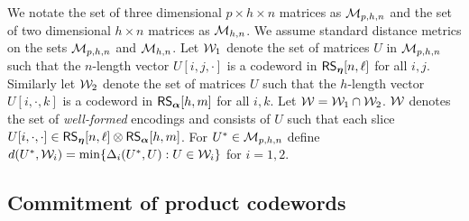 We notate the set of three dimensional $p\times h\times n$ matrices as $\mathcal{M}_{p,h,n}$ and
the set of two dimensional $h\times n$ matrices as $\mathcal{M}_{h, n}$. We
assume standard distance metrics on the sets $\mathcal{M}_{p,h,n}$ and $\mathcal{M}_{h,n}$.
Let $\mathcal{W}_1$ denote the set of matrices
$U$ in $\mathcal{M}_{p,h,n}$ such that the $n$-length vector $U[i,j,\cdot]$ is a
codeword in $\mathsf{RS}_{\bm{\eta}}[n,\ell]$ for all $i,j$. Similarly let $\mathcal{W}_2$ denote the set of
matrices $U$ such that the $h$-length vector $U[i,\cdot,k]$ is a codeword in
$\mathsf{RS}_{\bm{\alpha}}[h,m]$ for all $i,k$.  Let $\mathcal{W}=\mathcal{W}_1\cap \mathcal{W}_2$. $\mathcal{W}$ denotes the set of {\em well-formed} encodings  and consists of $U$ such that each slice $U[i,\cdot,\cdot]\in \mathsf{RS}_{\bm{\eta}}[n,\ell]\otimes \mathsf{RS}_{\bm{\alpha}}[h,m]$. For $U^\ast\in \mathcal{M}_{p,h,n}$ define
$d(U^\ast,\mathcal{W}_i)=\min\{\Delta_i(U^\ast,U):U\in \mathcal{W}_i\}$ for $i=1,2$.

\begin{comment}
We now fix the notation for some of the codes that will be
frequently used throughout this section. We use $L_1$ and $L_2$ to denote codes
$\rsc{\eta}{n,\ell}$ and $\rsc{\alpha}{h,m}$ respectively. Let $\mc{C}_1 := \ric{L_1}{h}$ 
and $\mc{C}_2 :=\cic{L_2}{n}$ denote the interleaved codes of $L_1$ and $L_2$. In addition, 
we use codes $L_3 := \rsc{\eta}{n,s+\ell-1}$, $L_4 := \rsc{\eta}{n,2\ell-1}$ and 
$L_5=\rsc{\alpha}{h,2m-1}$ to encode some intermediate computations in our protocols.
Let $\Lambda_{n,\ell}$ denote the matrix for the linear transformation that maps a vector $x\in \FF^\ell$ 
to the unique codeword $y$ in $L_1$ such that $y_i=x_i$ for $i\in [\ell]$. Thus $\Lambda_{n,\ell}$ is 
an $n\times \ell$ matrix. Let
$\Lambda_{h,m},\Lambda_{n,s+\ell-1},\Lambda_{n,2\ell-1}$ and $\Lambda_{h,2m-1}$ be similar matrices
for the codes $L_2,L_3,L_4$ and $L_5$ respectively. We denote the
parity check matrices for $L_i$  by $\mc{H}_i$ for $i\in \{1,\ldots,5\}$. 
We notate the set of three dimensional $p\times h\times n$ matrices as $\mc{M}_{p,h,n}$ and
the set of two dimensional $h\times n$ matrices as $\mc{M}_{h, n}$. We
assume standard distance metrics on the sets $\mc{M}_{p,h,n}$ and $\mc{M}_{h,n}$.
\end{comment}

\subsection{Commitment of product codewords}\label{sec:matrixcommitment}

